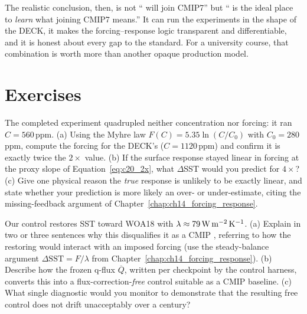The realistic conclusion, then, is not ``\model{} will join CMIP7'' but ``\model{}
is the ideal place to \emph{learn} what joining CMIP7 means.'' It can run the
experiments in the shape of the DECK, it makes the forcing--response logic
transparent and differentiable, and it is honest about every gap to the standard.
For a university course, that combination is worth more than another opaque
production model.

\section*{Exercises}

\begin{exercise}\label{ex:c20_4x}
The completed experiment quadrupled neither concentration nor forcing: it ran
$C=560\,$ppm. (a) Using the Myhre law $F(C)=5.35\ln(C/C_0)$ with $C_0=280\,$ppm,
compute the forcing for the DECK's  ($C=1120\,$ppm) and confirm
it is exactly twice the $2\times$ value. (b) If the surface response stayed linear
in forcing at the proxy slope of Equation~\eqref{eq:c20_2x}, what $\Delta$SST would
you predict for $4\times$? (c) Give one physical reason the \emph{true} response is
unlikely to be exactly linear, and state whether your prediction is more likely an
over- or under-estimate, citing the missing-feedback argument of
Chapter~\ref{chap:ch14_forcing_response}.
\end{exercise}

\begin{exercise}
Our control restores SST toward WOA18 with $\lambda\approx 79\,\mathrm{W\,m^{-2}}\,\mathrm{K^{-1}}$.
(a) Explain in two or three sentences why this disqualifies it as a CMIP
, referring to how the restoring would interact with an imposed
forcing (use the steady-balance argument $\Delta\mathrm{SST}=F/\lambda$ from
Chapter~\ref{chap:ch14_forcing_response}). (b) Describe how the frozen q-flux
$\overline{Q}$, written per checkpoint by the control harness, converts this into a
flux-correction-\emph{free} control suitable as a CMIP baseline. (c) What single
diagnostic would you monitor to demonstrate that the resulting free control does
not drift unacceptably over a century?
\end{exercise}

